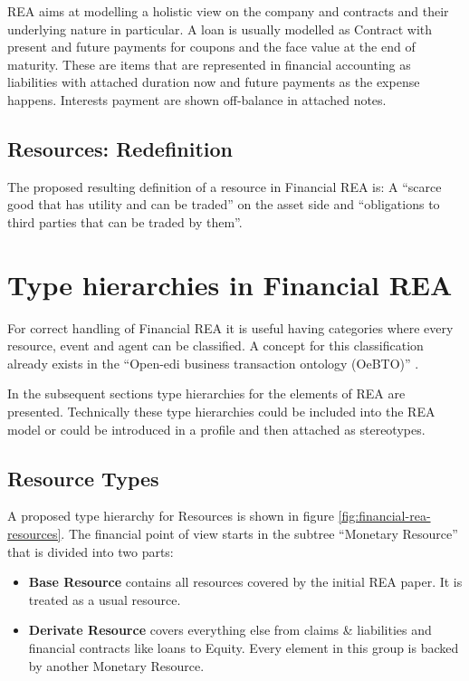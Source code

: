\documentclass[10pt,paper=a4,parskip]{scrartcl}
\newif\ifforme
\newcommand{\note}[1]{\unskip\ignorespaces\ifforme\textbf{#1}\else{}\fi}
\begin{document}
\note{Problem 2}
REA aims at modelling a holistic view on the company and contracts and their underlying nature in particular.
A loan is usually modelled as Contract with present and future payments for coupons and the face value at the end of maturity.
These are items that are represented in financial accounting as liabilities with attached duration now and future payments as the expense happens.
Interests payment are shown off-balance in attached notes.

\subsection{Resources: Redefinition}

The proposed resulting definition of a resource in Financial REA is:
A ``scarce good that has utility and can be traded'' on the asset side and ``obligations to third parties that can be traded by them''.

\section{Type hierarchies in Financial REA}

For correct handling of Financial REA it is useful having categories where every resource, event and agent can be classified.
A concept for this classification already exists in the ``Open-edi business transaction ontology (OeBTO)'' \cite[Section 5.4]{ISOIEC1594442007}.


In the subsequent sections type hierarchies for the elements of REA are presented.
Technically these type hierarchies could be included into the REA model or could be introduced in a profile and then attached as stereotypes.

\subsection{Resource Types}

A proposed type hierarchy for Resources is shown in figure \ref{fig:financial-rea-resources}. The financial point of view starts in the subtree ``Monetary Resource'' that is divided into two parts: 

\begin{itemize}
\item \textbf{Base Resource} contains all resources covered by the initial REA paper. It is treated as a usual resource.
\item \textbf{Derivate Resource} covers everything else from claims \& liabilities and financial contracts like loans to Equity. Every element in this group is backed by another Monetary Resource.
\end{itemize}
\end{document}
